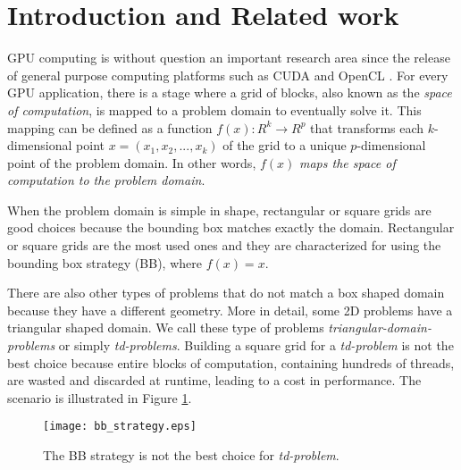 \documentclass[conference]{IEEEtran}
\begin{document}
\IEEEpeerreviewmaketitle

\section{Introduction and Related work}
\label{sec_introduction}
GPU computing is without question an important research area \cite{citeulike:2767438, Nickolls:2010:GCE:1803935.1804055} since the release 
of general purpose computing platforms such as CUDA \cite{nvidia_cuda_guide} and OpenCL \cite{opencl08}. 
For every GPU application, there is a stage where a grid of blocks, also known as the \textit{space of computation}, 
is mapped to a problem domain to eventually solve it.
This mapping can be defined as a function $f(x): R^k \rightarrow R^p$ that transforms each $k$-dimensional point 
$x=(x_1, x_2, ..., x_k)$ of the grid to a unique $p$-dimensional point of the problem domain. 
In other words, $f(x)$ \textit{maps the space of computation to the problem domain}. 

When the problem domain is simple in shape, rectangular or square grids are good choices because the bounding box matches exactly the domain. 
Rectangular or square grids are the most used ones and they are characterized for using the bounding box strategy (BB), where $f(x) = x$.

There are also other types of problems that do not match a box shaped domain because they have a different geometry. 
More in detail, some 2D problems have a triangular shaped domain. We call these type of problems \textit{triangular-domain-problems} 
or simply \textit{td-problems}. Building a square grid for a \textit{td-problem} is not the best choice 
because entire blocks of computation, containing hundreds of threads, are wasted and discarded at runtime, leading to a cost in 
performance. The scenario is illustrated in Figure \ref{fig_bb_strategy}.
\begin{figure}[ht!]
\centering
\texttt{[image: bb\_strategy.eps]}
\caption{The BB strategy is not the best choice for \textit{td-problem}.}
\label{fig_bb_strategy}
\end{figure}
\end{document}
